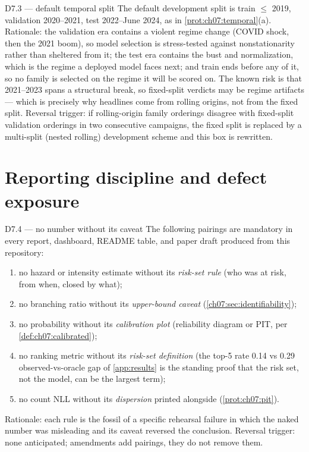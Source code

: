 \begin{decision}{D7.3 --- default temporal split}
The default development split is train $\le$ 2019, validation 2020--2021,
test 2022--June 2024, as in \cref{prot:ch07:temporal}(a). Rationale: the
validation era contains a violent regime change (COVID shock, then the
2021 boom), so model selection is stress-tested against nonstationarity
rather than sheltered from it; the test era contains the bust and
normalization, which is the regime a deployed model faces next; and
train ends before any of it, so no family is selected on the regime it
will be scored on. The known risk is that 2021--2023 spans a structural
break, so fixed-split verdicts may be regime artifacts --- which is
precisely why headlines come from rolling origins, not from the fixed
split. Reversal trigger: if rolling-origin family orderings disagree with
fixed-split validation orderings in two consecutive campaigns, the fixed
split is replaced by a multi-split (nested rolling) development scheme
and this box is rewritten.
\end{decision}

\section{Reporting discipline and defect exposure}\label{ch07:sec:reporting}

\begin{decision}{D7.4 --- no number without its caveat}
The following pairings are mandatory in every report, dashboard, README
table, and paper draft produced from this repository:
\begin{enumerate}[label=(\roman*)]
\item no hazard or intensity estimate without its \emph{risk-set rule}
(who was at risk, from when, closed by what);
\item no branching ratio without its \emph{upper-bound caveat}
(\cref{ch07:sec:identifiability});
\item no probability without its \emph{calibration plot} (reliability
diagram or PIT, per \cref{def:ch07:calibrated});
\item no ranking metric without its \emph{risk-set definition} (the
top-5 rate 0.14 vs 0.29 observed-vs-oracle gap of \cref{app:results} is
the standing proof that the risk set, not the model, can be the largest
term);
\item no count NLL without its \emph{dispersion} printed alongside
(\cref{prot:ch07:pit}).
\end{enumerate}
Rationale: each rule is the fossil of a specific rehearsal failure in
which the naked number was misleading and its caveat reversed the
conclusion. Reversal trigger: none anticipated; amendments add pairings,
they do not remove them.
\end{decision}

